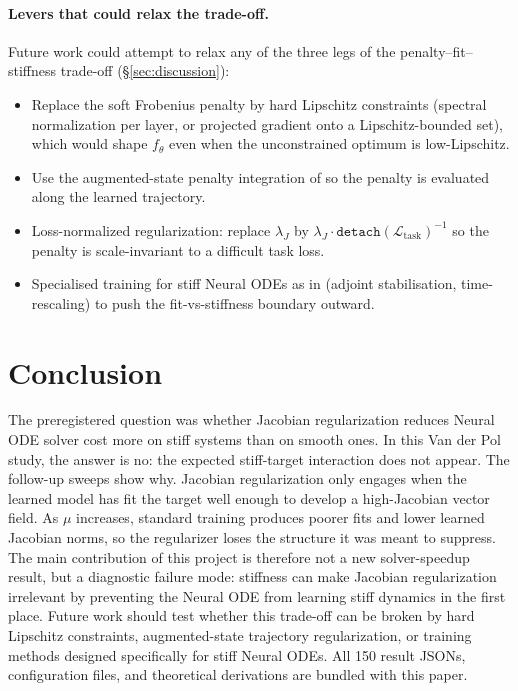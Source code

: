 \documentclass[11pt]{article}
\theoremstyle{plain}
\theoremstyle{definition}
\begin{document}
\paragraph{Levers that could relax the trade-off.}
Future work could attempt to relax any of the three legs of the
penalty--fit--stiffness trade-off (\S\ref{sec:discussion}):
\begin{itemize}[leftmargin=2em]
\item Replace the soft Frobenius penalty by hard Lipschitz constraints
  (spectral normalization per layer, or projected gradient onto a
  Lipschitz-bounded set), which would shape $f_\theta$ even when the
  unconstrained optimum is low-Lipschitz.
\item Use the augmented-state penalty integration of \citet{finlay2020train}
  so the penalty is evaluated along the learned trajectory.
\item Loss-normalized regularization: replace $\lambda_J$ by
  $\lambda_J \cdot \texttt{detach}(\mathcal{L}_\text{task})^{-1}$ so the
  penalty is scale-invariant to a difficult task loss.
\item Specialised training for stiff Neural ODEs as in \citet{kim2021stiff}
  (adjoint stabilisation, time-rescaling) to push the fit-vs-stiffness
  boundary outward.
\end{itemize}

\section{Conclusion}
\label{sec:conclusion}

The preregistered question was whether Jacobian regularization reduces
Neural ODE solver cost more on stiff systems than on smooth ones. In this
Van der Pol study, the answer is no: the expected stiff-target interaction
does not appear. The follow-up sweeps show why. Jacobian regularization only
engages when the learned model has fit the target well enough to develop a
high-Jacobian vector field. As $\mu$ increases, standard training produces
poorer fits and lower learned Jacobian norms, so the regularizer loses the
structure it was meant to suppress. The main contribution of this project is
therefore not a new solver-speedup result, but a diagnostic failure mode:
stiffness can make Jacobian regularization irrelevant by preventing the Neural
ODE from learning stiff dynamics in the first place. Future work should test
whether this trade-off can be broken by hard Lipschitz constraints,
augmented-state trajectory regularization, or training methods designed
specifically for stiff Neural ODEs. All 150 result JSONs, configuration files,
and theoretical derivations are bundled with this paper.





\end{document}
